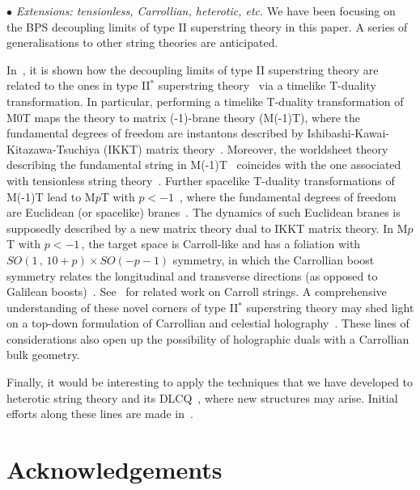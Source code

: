 \documentclass[11pt]{article}
\renewcommand{\emph}[1]{\textit{#1}}
\begin{document}
\vspace{3mm}

\noindent $\bullet$ 
\emph{Extensions: tensionless, Carrollian, heterotic, etc.} We have been focusing on the BPS decoupling limits of type II superstring theory in this paper. A series of generalisations to other string theories are anticipated. 

In~\cite{Blair:2023noj, Gomis:2023eav}, it is shown how the decoupling limits of type II superstring theory are related to the ones in type II${}^*$ superstring theory~\cite{Hull:1998vg} via a timelike T-duality transformation. In particular, performing a timelike T-duality transformation of M0T maps the theory to matrix (-1)-brane theory (M(-1)T), where the fundamental degrees of freedom are instantons described by Ishibashi-Kawai-Kitazawa-Tsuchiya (IKKT) matrix theory~\cite{Ishibashi:1996xs}. Moreover, the worldsheet theory describing the fundamental string in M(-1)T~\cite{Gomis:2023eav} coincides with the one associated with tensionless string theory~\cite{Lindstrom:1990qb, Isberg:1993av}. Further spacelike T-duality transformations of M(-1)T lead to M$p$T with $p < -1$~\cite{Blair:2023noj, Gomis:2023eav}, where the fundamental degrees of freedom are Euclidean (or spacelike) branes~\cite{Hull:1998vg, Gutperle:2002ai}. The dynamics of such Euclidean branes is supposedly described by a new matrix theory dual to IKKT matrix theory. In M$p$T with $p < -1$\,, the target space is Carroll-like and has a foliation with $SO(1\,,\,10+p) \times SO(-p-1)$ symmetry, in which the Carrollian boost symmetry relates the longitudinal and transverse directions (as opposed to Galilean boosts)~\cite{Blair:2023noj,Gomis:2023eav}. 
See~\cite{Cardona:2016ytk,Bagchi:2023cfp,Harksen:2024bnh,Bagchi:2024rje} for related work on Carroll strings. A comprehensive understanding of these novel corners of type II${}^*$ superstring theory may shed light on a top-down formulation of Carrollian and celestial holography~\cite{Donnay:2022aba, Donnay:2023mrd}. These lines of considerations also open up the possibility of holographic duals with a Carrollian bulk geometry. 

Finally, it would be interesting to apply the techniques that we have developed to heterotic string theory and its DLCQ~\cite{Danielsson:1996es, Kachru:1996nd, Banks:1997it, Motl:1997tb}, where new structures may arise. Initial efforts along these lines are made in~\cite{Bergshoeff:2023fcf,Lescano:2024url, hete}. 


\section*{Acknowledgements}
\end{document}
